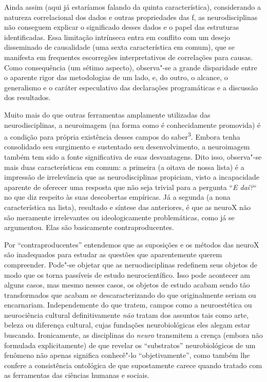 Ainda assim (aqui já estaríamos falando da quinta característica),
considerando a natureza correlacional dos dados e outras propriedades
das f, as neurodisciplinas não conseguem explicar o significado
desses dados e o papel das estruturas identificadas. Essa limitação
intrínseca entra em conflito com um desejo disseminado de causalidade
(uma sexta característica em comum), que se manifesta em frequentes
escorregões interpretativos de correlações para causas. Como
consequência (um sétimo aspecto), observa"-se a grande disparidade entre
o aparente rigor das metodologias de um lado, e, do outro, o alcance, o
generalismo e o caráter especulativo das declarações programáticas e a
discussão dos resultados.

Muito mais do que outras ferramentas amplamente utilizadas das
neurodisciplinas, a neuroimagem (na forma como é conhecidamente
promovida) é a condição para própria existência desses campos do
saber\textsuperscript{3}. Embora tenha consolidado seu surgimento e
sustentado seu desenvolvimento, a neuroimagem também tem sido a fonte
significativa de suas desvantagens. Dito isso, observa"-se mais duas
características em comum: a primeira (a oitava de nossa lista) é a
impressão de irrelevância que as neurodisciplinas propiciam, visto a
incapacidade aparente de oferecer uma resposta que não seja trivial para
a pergunta ``\emph{E daí?}`` no que diz respeito às suas descobertas
empíricas. Já a segunda (a nona característica na lista), resultado e
síntese das anteriores, é que as neuroX não são meramente irrelevantes
ou ideologicamente problemáticas, como já se argumentou. Elas são
basicamente contraproducentes.

Por ``contraproducentes'' entendemos que as suposições e os métodos das
neuroX são inadequados para estudar as questões que aparentemente querem
compreender. Pode"-se objetar que as neruodisciplinas redefinem seus
objetos de modo que os torna passíveis de estudo neurocientífico. Isso
pode acontecer am alguns casos, mas mesmo nesses casos, os objetos de
estudo acabam sendo tão transformados que acabam se descaracterizando do
que originalmente seriam ou encarnariam. Independemente do que tratem,
campos como a neuroestética ou neurociência cultural definitivamente
\emph{não} tratam dos assuntos tais como arte, beleza ou diferença
cultural, cujas fundações neurobiológicas eles alegam estar buscando.
Ironicamente, as disciplinas do \emph{neuro} transmitem a crença (embora
não formulada explicitamente) de que revelar os ``substratos''
neurobiológicos de um fenômeno não apenas significa conhecê"-lo
``objetivamente'', como também lhe confere a consistência ontológica de
que supostamente carece quando tratado com as ferramentas das ciências
humanas e sociais.

